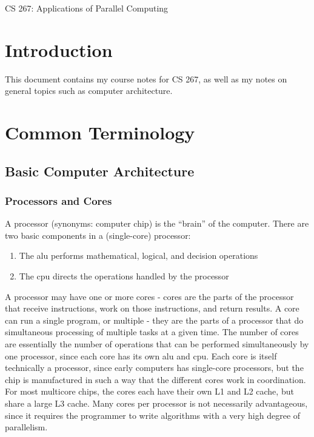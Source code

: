 \documentclass[10pt]{article}
\begin{document}
\begin{centering}
\Large CS 267: Applications of Parallel Computing\\
\end{centering}

\tableofcontents
\clearpage

\section{Introduction}
\begin{flushleft}\justify

This document contains my course notes for CS 267, as well as my notes on general topics such as computer architecture.

\section{Common Terminology}

\subsection{Basic Computer Architecture}

\subsubsection{Processors and Cores}
A processor (synonyms: computer chip) is the ``brain'' of the computer. There are two basic components in a (single-core) processor:

\begin{enumerate}
\item The \gls{alu} performs mathematical, logical, and decision operations
\item The \gls{cpu} directs the operations handled by the processor
\end{enumerate}

A processor may have one or more cores - cores are the parts of the processor that receive instructions, work on those instructions, and return results. A core can run a single program, or multiple - they are the parts of a processor that do simultaneous processing of multiple tasks at a given time. The number of cores are essentially the number of operations that can be performed simultaneously by one processor, since each core has its own \gls{alu} and \gls{cpu}. Each core is itself technically a processor, since early computers has single-core processors, but the chip is manufactured in such a way that the different cores work in coordination. For most multicore chips, the cores each have their own L1 and L2 cache, but share a large L3 cache. Many cores per processor is not necessarily advantageous, since it requires the programmer to write algorithms with a very high degree of parallelism.


\end{flushleft}
\end{document}
